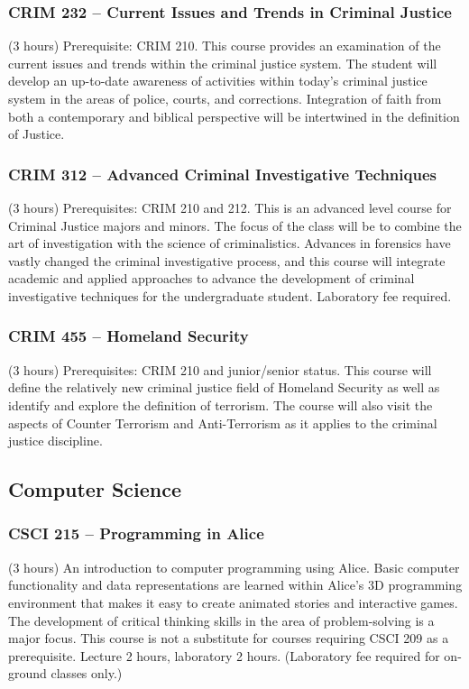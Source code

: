 \subsubsection{CRIM 232 -- Current Issues and Trends in Criminal Justice}
(3 hours) Prerequisite: CRIM 210. This course provides an examination of the current issues and trends within the criminal justice system. The student will develop an up-to-date awareness of activities within today’s criminal justice system in the areas of police, courts, and corrections. Integration of faith from both a contemporary and biblical perspective will be intertwined in the definition of Justice.

\subsubsection{CRIM 312 -- Advanced Criminal Investigative Techniques}
(3 hours) Prerequisites: CRIM 210 and 212. This is an advanced level course for Criminal Justice majors and minors. The focus of the class will be to combine the art of investigation with the science of criminalistics.  Advances in forensics have vastly changed the criminal investigative process, and this course will integrate academic and applied approaches to advance the development of criminal investigative techniques for the undergraduate student. Laboratory fee required.

\subsubsection{CRIM 455 -- Homeland Security}
(3 hours) Prerequisites: CRIM 210 and junior/senior status. This course will define the relatively new criminal justice field of Homeland Security as well as identify and explore the definition of terrorism. The course will also visit the aspects of Counter Terrorism and Anti-Terrorism as it applies to the criminal justice discipline.


\subsection{Computer Science}

\subsubsection{CSCI 215 -- Programming in Alice}
(3 hours) An introduction to computer programming using Alice. Basic computer functionality and data representations are learned within Alice’s 3D programming environment that makes it easy to create animated stories and interactive games. The development of critical thinking skills in the area of problem-solving is a major focus. This course is not a substitute for courses requiring CSCI 209 as a prerequisite. Lecture 2 hours, laboratory 2 hours. (Laboratory fee required for on-ground classes only.)


